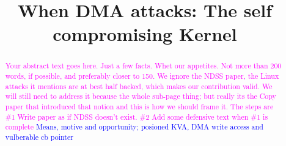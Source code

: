 \usepackage{filecontents}

\providecommand{\data}{\textit{data }}
\providecommand{\shinfo}{\texttt{skb\_shared\_info }}
\providecommand{\skb}{\texttt{sk\_buff }}
\providecommand{\page}{\texttt{struct page }}
\providecommand{\uarg}{\texttt{ubuf\_info }}
\providecommand{\kva}{KVA }
\providecommand{\iova}{IOVA }
\providecommand{\mabaf}{malicious buffer }
\providecommand{\spb}{SPB\-2 }
\providecommand{\oportunity}{\textit{Opportunity} }
\providecommand{\means}{\textit{Means} }

\newcommand{\SV}[1]{{\textcolor{red}{[Shay:#1}]}} 



\date{}

\title{\Large \bf When DMA attacks: The self compromising Kernel}

\begin{comment}
\author{
{\rm Markuze Alex}\\
Technion, VMware Research
\and
{\rm Gil Kupfer}\\
Technion
\and
{\rm Nadav Amit}\\
VMware Research
\and{\rm Dan Tsafrir}\\
Technion, VMware Research
} %
\end{comment}

\maketitle

\begin{abstract}
\textcolor{magenta}{Your abstract text goes here. Just a few facts. Whet our appetites.
Not more than 200 words, if possible, and preferably closer to 150.\newline
We ignore the NDSS paper, the Linux attacks it mentions are at best half backed, which makes our contribution valid. We will still need to address it because the whole sub-page thing; but really its the Copy paper that introduced that notion and this is how we should frame it. The steps are \#1 Write paper as if NDSS doesn't exist. \#2 Add some defensive text when \#1 is complete}
\newline
\textcolor{blue}{Means, motive and opportunity; posioned KVA, DMA write access and vulberable cb pointer}
\end{abstract}


